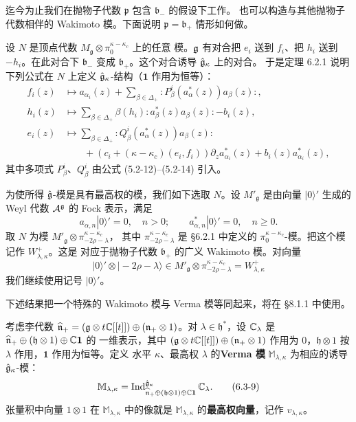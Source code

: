 迄今为止我们在抛物子代数 $\mathfrak p$ 包含 $\mathfrak b_-$ 的假设下工作。
也可以构造与其他抛物子代数相伴的 Wakimoto 模。下面说明 $\mathfrak p=
\mathfrak b_+$ 情形如何做。

设 $N$ 是顶点代数 $M_{\mathfrak g}\otimes\pi_0^{\kappa-\kappa_c}$ 上的任意
模。$\mathfrak{g}$ 有对合把 $e_i$ 送到 $f_i$、把 $h_i$ 送到 $-h_i$。在此对合下
$\mathfrak b_-$ 变成 $\mathfrak b_+$。这个对合诱导 $\hat{\mathfrak{g}}_\kappa$ 上的对合。
于是定理 6.2.1 说明下列公式在 $N$ 上定义 $\hat{\mathfrak{g}}_\kappa$-结构（$\mathbf 1$
作用为恒等）：
\[
    \begin{aligned}
        f_i(z)&\mapsto a_{\alpha_i}(z)+\sum_{\beta\in\Delta_+}
        :\!P^i_\beta(a^*_\alpha(z))a_\beta(z)\!:,\\
        h_i(z)&\mapsto\sum_{\beta\in\Delta_+}
        \beta(h_i):\!a^*_\beta(z)a_\beta(z)\!:-b_i(z),\\
        e_i(z)&\mapsto\sum_{\beta\in\Delta_+}
        :\!Q^i_\beta(a^*_\alpha(z))a_\beta(z)\!:\\
        &\qquad+\left(c_i+(\kappa-\kappa_c)(e_i,f_i)\right)
        \partial_za^*_{\alpha_i}(z)+b_i(z)a^*_{\alpha_i}(z),
    \end{aligned}
\]
其中多项式 $P^i_\beta$、$Q^i_\beta$ 由公式 (5.2-12)--(5.2-14) 引入。

为使所得 $\hat{\mathfrak{g}}$-模是具有最高权的模，我们如下选取 $N$。设
$M'_{\mathfrak g}$ 是由向量 $|0\rangle'$ 生成的 Weyl 代数
$\mathcal{A}^{\mathfrak g}$ 的 Fock 表示，满足
\[
    a_{\alpha,n}|0\rangle'=0,\quad n>0;\qquad
    a^*_{\alpha,n}|0\rangle'=0,\quad n\ge0.
\]
取 $N$ 为模 $M'_{\mathfrak g}\otimes\pi^{\kappa-\kappa_c}_{-2\rho-\lambda}$，
其中 $\pi^{\kappa-\kappa_c}_{-2\rho-\lambda}$ 是 \S6.2.1 中定义的
$\pi^{\kappa-\kappa_c}_0$-模。把这个模记作 $W^+_{\lambda,\kappa}$。这是
对应于抛物子代数 $\mathfrak b_+$ 的广义 Wakimoto 模。对向量
\begin{equation}
    |0\rangle'\otimes|-2\rho-\lambda\rangle
    \in M'_{\mathfrak g}\otimes\pi^{\kappa-\kappa_c}_{-2\rho-\lambda}
    =W^+_{\lambda,\kappa}
    \tag{6.3-8}
\end{equation}
我们继续使用记号 $|0\rangle'$。

下述结果把一个特殊的 Wakimoto 模与 Verma 模等同起来，将在 \S8.1.1 中使用。

考虑李代数 $\widehat{\mathfrak n}_+=(\mathfrak{g}\otimes t\mathbb{C}[[t]])\oplus
(\mathfrak n_+\otimes1)$。对 $\lambda\in\mathfrak h^*$，设 $\mathbb{C}_\lambda$ 是
$\widehat{\mathfrak n}_+\oplus(\mathfrak h\otimes1)\oplus\mathbb{C}\mathbf 1$ 的
一维表示，其中 $(\mathfrak{g}\otimes t\mathbb{C}[[t]])\oplus(\mathfrak n_+\otimes1)$ 作用为
$0$，$\mathfrak h\otimes1$ 按 $\lambda$ 作用，$\mathbf 1$ 作用为恒等。定义
水平 $\kappa$、最高权 $\lambda$ 的\textbf{Verma 模} $\mathbb M_{\lambda,\kappa}$
为相应的诱导 $\hat{\mathfrak{g}}_\kappa$-模：
\begin{equation}
    \mathbb M_{\lambda,\kappa}
    =\operatorname{Ind}_{\widehat{\mathfrak n}_+\oplus(\mathfrak h\otimes1)\oplus\mathbb{C}\mathbf 1}
    ^{\hat{\mathfrak{g}}_\kappa}\mathbb{C}_\lambda.
    \tag{6.3-9}
\end{equation}
张量积中向量 $1\otimes1$ 在 $\mathbb M_{\lambda,\kappa}$ 中的像就是
$\mathbb M_{\lambda,\kappa}$ 的\textbf{最高权向量}，记作
$v_{\lambda,\kappa}$。


